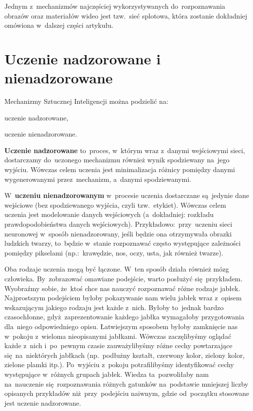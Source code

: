\documentclass[oneside, 11pt, a4paper]{article}
\begin{document}
\begin{multicols}{2}
Jednym z~mechanizmów najczęściej wykorzystywanych do~rozpoznawania obrazów oraz materiałów wideo jest tzw.~sieć splotowa, która zostanie dokładniej omówiona w~dalszej części artykułu.

\section{Uczenie nadzorowane i nienadzorowane}
Mechanizmy Sztucznej Inteligencji można podzielić na:
\begin{compactitem}
	\item uczenie nadzorowane,
	\item uczenie nienadzorowane.
\end{compactitem}
\vspace{2mm}

\textbf{Uczenie nadzorowane} to~proces, w~którym wraz z~danymi wejściowymi sieci, dostarczamy do~uczonego mechanizmu również wynik spodziewany na~jego wyjściu. Wówczas celem uczenia jest minimalizacja różnicy pomiędzy danymi wygenerowanymi przez~mechanizm, a~danymi spodziewanymi.

W~\textbf{uczeniu nienadzorowanym} w~procesie uczenia dostarczane są~jedynie dane wejściowe (bez spodziewanego wyjścia, czyli tzw.~etykiet). Wówczas celem uczenia jest modelowanie danych wejściowych (a~dokładniej: rozkładu prawdopodobieństwa danych wejściowych). Przykładowo:~przy~uczeniu sieci neuronowej w~sposób nienadzorowany, jeśli będzie ona otrzymywała obrazki ludzkich twarzy, to~będzie w~stanie rozpoznawać często występujące zależności pomiędzy pikselami (np.:~krawędzie, nos, oczy, usta, jak również twarze).

Oba rodzaje uczenia mogą być łączone. W~ten sposób działa również mózg człowieka. By~zobrazować omawiane podejście, warto posłużyć się~przykładem. Wyobraźmy sobie, że~ktoś chce nas nauczyć rozpoznawać różne rodzaje jabłek. Najprostszym podejściem byłoby pokazywanie nam wielu jabłek wraz z~opisem wskazującym jakiego rodzaju jest każde z~nich. Byłoby to~jednak bardzo czasochłonne, gdyż~zaprezentowanie każdego jabłka wymagałoby przygotowania dla~niego odpowiedniego opisu. Łatwiejszym sposobem byłoby zamknięcie nas w~pokoju z~wieloma nieopisanymi jabłkami. Wówczas zaczęlibyśmy oglądać każde z~nich i~po~pewnym czasie zauważylibyśmy różne cechy powtarzające się~na~niektórych jabłkach (np.~podłużny kształt, czerwony kolor, zielony kolor, zielone plamki itp.). Po~wyjściu z~pokoju potrafilibyśmy identyfikować cechy występujące w~różnych grupach jabłek. Wiedza ta~pozwoliłaby nam na~nauczenie się~rozpoznawania różnych gatunków na~podstawie mniejszej liczby opisanych przykładów niż~przy~podejściu naiwnym, gdzie od~początku stosowane jest uczenie nadzorowane.


\end{multicols}
\end{document}
